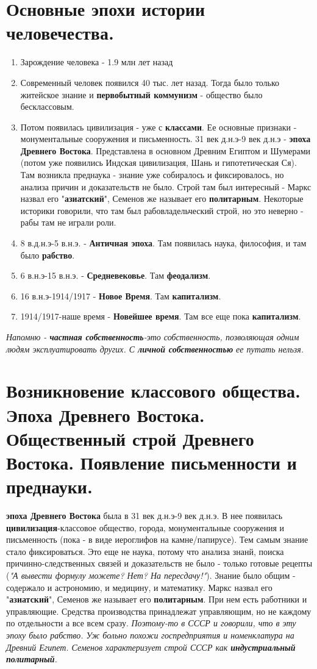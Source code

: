 \documentclass[12pt,a4paper]{article}
\begin{document}
\section{Основные эпохи истории человечества.}
\begin{enumerate}
\item Зарождение человека - 1.9 млн лет назад
\item Современный человек появился 40 тыс. лет назад.
Тогда было только житейское знание и \textbf{первобытный коммунизм} - общество было бесклассовым.
\item Потом появилась цивилизация  - уже с \textbf{классами}. Ее основные признаки - монументальные сооружения и письменность.
31 век д.н.э-9 век д.н.э - \textbf{эпоха Древнего Востока}. Представлена в основном Древним Египтом и Шумерами (потом уже появились Индская цивилизация, Шань и гипотетическая Ся).
Там возникла преднаука - знание уже собиралось и фиксировалось, но анализа причин и доказательств не было.
Строй там был интересный - Маркс назвал его "\textbf{азиатский}", Семенов же называет его \textbf{политарным}. Некоторые историки говорили, что там был рабовладельческий строй, но это неверно - рабы там не играли роли.
\item 8 в.д.н.э-5 в.н.э. - \textbf{Античная эпоха}. Там появилась наука, философия, и там было \textbf{рабство}.
\item 6 в.н.э-15 в.н.э. - \textbf{Средневековье}. Там \textbf{феодализм}.
\item 16 в.н.э-1914/1917 - \textbf{Новое Время}. Там \textbf{капитализм}.
\item 1914/1917-наше время - \textbf{Новейшее время}. Там все еще пока \textbf{капитализм}.
\end{enumerate}
\textit{Напомню - \textbf{частная собственность}-это собственность, позволяющая одним людям эксплуатировать других. С \textbf{личной собственностью} ее путать нельзя.}

\section{Возникновение классового общества. Эпоха Древнего Востока. Общественный строй Древнего Востока. Появление письменности и преднауки.}
\textbf{эпоха Древнего Востока} была в 31 век д.н.э-9 век д.н.э. В нее появилась \textbf{цивилизация}-классовое общество, города, монументальные сооружения и письменность (пока - в виде иероглифов на камне/папирусе). Тем самым знание стало фиксироваться. Это еще не наука, потому что анализа знанй, поиска причинно-следственных связей и доказательств не было - только готовые рецепты (\textit{"А вывести формулу можете? Нет? На пересдачу!"}). Знание было общим - содержало и астрономию, и медицину, и математику. Маркс назвал его "\textbf{азиатский}", Семенов же называет его \textbf{политарным}. При нем есть работники и управляющие. Средства производства принадлежат управляющим, но не каждому по отдельности а все всем сразу. \textit{Поэтому-то в СССР и говорили, что в эту эпоху было рабство. Уж больно похожи госпредприятия и номенклатура на Древний Египет. Семенов характеризует строй СССР как \textbf{индустриальный политарный}.}
\end{document}
